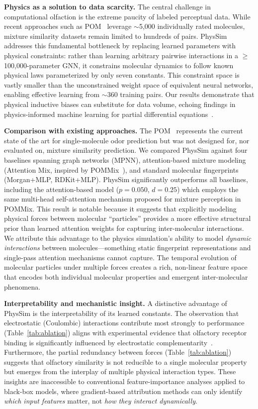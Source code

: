 \documentclass[11pt,a4paper]{article}
\begin{document}
\textbf{Physics as a solution to data scarcity.} The central challenge in computational olfaction is the extreme paucity of labeled perceptual data. While recent approaches such as POM~\cite{lee2023pom} leverage $\sim$5,000 individually rated molecules, mixture similarity datasets remain limited to hundreds of pairs. PhysSim addresses this fundamental bottleneck by replacing learned parameters with physical constraints: rather than learning arbitrary pairwise interactions in a $\geq$100,000-parameter GNN, it constrains molecular dynamics to follow known physical laws parameterized by only seven constants. This constraint space is vastly smaller than the unconstrained weight space of equivalent neural networks, enabling effective learning from $\sim$360 training pairs. Our results demonstrate that physical inductive biases can substitute for data volume, echoing findings in physics-informed machine learning for partial differential equations~\cite{raissi2019,karniadakis2021}.

\textbf{Comparison with existing approaches.} The POM~\cite{lee2023pom} represents the current state of the art for single-molecule odor prediction but was not designed for, nor evaluated on, mixture similarity prediction. We compared PhysSim against four baselines spanning graph networks (MPNN), attention-based mixture modeling (Attention Mix, inspired by POMMix~\cite{nguyen2025pommix}), and standard molecular fingerprints (Morgan+MLP, RDKit+MLP). PhysSim significantly outperforms all baselines, including the attention-based model ($p = 0.050$, $d = 0.25$) which employs the same multi-head self-attention mechanism proposed for mixture perception in POMMix. This result is notable because it suggests that explicitly modeling physical forces between molecular ``particles'' provides a more effective structural prior than learned attention weights for capturing inter-molecular interactions. We attribute this advantage to the physics simulation's ability to model \emph{dynamic interactions} between molecules---something static fingerprint representations and single-pass attention mechanisms cannot capture. The temporal evolution of molecular particles under multiple forces creates a rich, non-linear feature space that encodes both individual molecular properties and emergent inter-molecular phenomena.

\textbf{Interpretability and mechanistic insight.} A distinctive advantage of PhysSim is the interpretability of its learned constants. The observation that electrostatic (Coulombic) interactions contribute most strongly to performance (Table~\ref{tab:ablation}) aligns with experimental evidence that olfactory receptor binding is significantly influenced by electrostatic complementarity~\cite{block2015}. Furthermore, the partial redundancy between forces (Table~\ref{tab:ablation}) suggests that olfactory similarity is not reducible to a single molecular property but emerges from the interplay of multiple physical interaction types. These insights are inaccessible to conventional feature-importance analyses applied to black-box models, where gradient-based attribution methods can only identify \emph{which input features} matter, not \emph{how they interact dynamically}.
\end{document}
